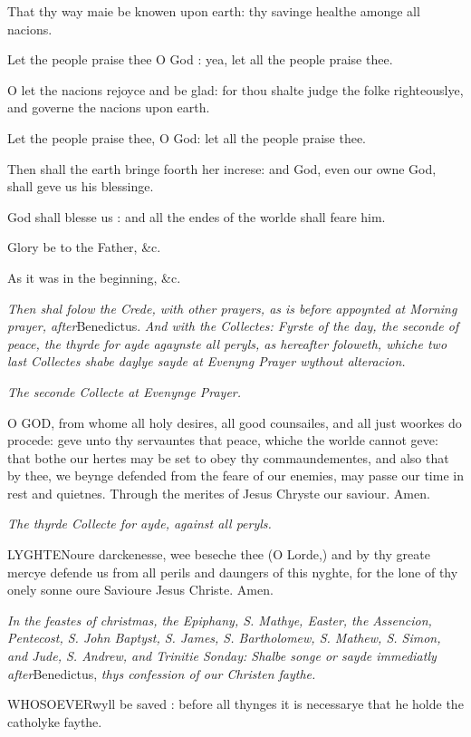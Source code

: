 That thy way maie be knowen upon earth: thy savinge
healthe amonge all nacions.

Let the people praise thee O God : yea, let all the
people praise thee.

O let the nacions rejoyce and be glad: for thou shalte
judge the folke righteouslye, and governe the nacions upon earth.

Let the people praise thee, O God: let all the people
praise thee.

Then shall the earth bringe foorth her increse: and
God, even our owne God, shall geve us his blessinge.

God shall blesse us : and all the endes of the worlde
shall feare him.

Glory be to the Father, \&c.

As it was in the beginning, \&c.

\emph{Then shal folow the Crede, with other prayers, as is before appoynted
at Morning prayer, after}Benedictus. \emph{And with the Collectes: Fyrste
of the day, the seconde of peace, the thyrde for ayde agaynste all peryls,
as hereafter foloweth, whiche two last Collectes shabe daylye sayde at
Evenyng Prayer wythout alteracion.}

\emph{The
seconde Collecte at Evenynge Prayer.}

O GOD,
from whome all holy desires, all good counsailes, and all just woorkes
do procede: geve unto thy servauntes that peace, whiche the worlde cannot
geve: that bothe our hertes may be set to obey thy commaundementes, and
also that by thee, we beynge defended from the feare of our enemies, may
passe our time in rest and quietnes. Through the merites of Jesus Chryste
our saviour. Amen.

\emph{The
thyrde Collecte for ayde, against all peryls.}

LYGHTEN\textbf{}oure darckenesse, wee beseche thee (O Lorde,) and by thy greate mercye
defende us from all perils and daungers of this nyghte, for the lone of
thy onely sonne oure Savioure Jesus Christe. Amen.

\emph{}\emph{In the
feastes of christmas, the Epiphany, S. Mathye, Easter, the Assencion,
Pentecost, S. John Baptyst, S. James, S. Bartholomew, S. Mathew, S. Simon,
and Jude, S. Andrew, and Trinitie Sonday: Shalbe songe or sayde immediatly
after}Benedictus, \emph{thys confession of our Christen faythe.}

WHOSOEVER\textbf{}wyll be saved : before all thynges it is necessarye that he holde
the catholyke faythe.

